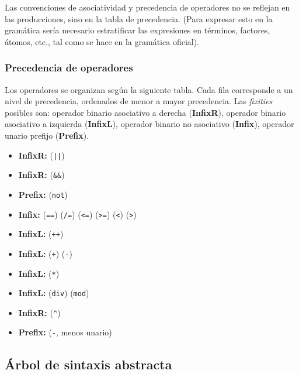\documentclass{article}
\begin{document}
Las convenciones de asociatividad y precedencia de operadores no se reflejan
en las producciones, sino en la tabla de precedencia.
(Para expresar esto en la gram\'atica ser\'ia necesario estratificar las expresiones
en t\'erminos, factores, \'atomos, etc., tal como se hace en la gram\'atica oficial).
\bigskip



\subsubsection{Precedencia de operadores}

Los operadores se organizan seg\'un la siguiente tabla.
Cada fila corresponde a un nivel de precedencia, ordenados de menor a mayor precedencia.
Las {\em fixities} posibles son:
operador binario asociativo a derecha ({\bf InfixR}),
operador binario asociativo a izquierda ({\bf InfixL}),
operador binario no asociativo ({\bf Infix}),
operador unario prefijo ({\bf Prefix}).

\begin{itemize}
\item {\bf InfixR:}  (\texttt{||})
\item {\bf InfixR:}  (\texttt{\&\&})
\item {\bf Prefix:}  (\texttt{not})
\item {\bf Infix:}
   (\texttt{==})
   (\texttt{/=})
   (\texttt{<=})
   (\texttt{>=})
   (\texttt{<})
   (\texttt{>})
\item {\bf InfixL:}
   (\texttt{++})
\item {\bf InfixL:}
   (\texttt{+})
   (\texttt{-})
\item {\bf InfixL:}
   (\texttt{*})
\item {\bf InfixL:}
   (\texttt{div})
   (\texttt{mod})
\item {\bf InfixR:}
   (\texttt{\^})
\item {\bf Prefix:}
   (\texttt{-}, menos unario)
\end{itemize}

\subsection{\'Arbol de sintaxis abstracta}
\end{document}
